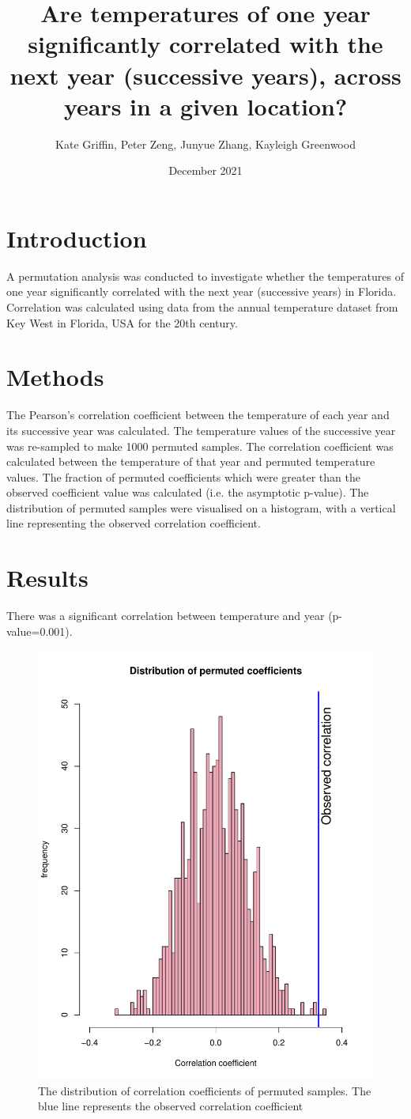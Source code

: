 \documentclass{article}
\title{Are temperatures of one year significantly correlated with the next year (successive years), across years in a given location?}
\author{Kate Griffin, Peter Zeng, Junyue Zhang, Kayleigh Greenwood}
\date{December 2021}
\begin{document}
	
	\maketitle
	
	\section{Introduction}
	A permutation analysis was conducted to investigate whether the temperatures of one year significantly correlated with the next year (successive years) in Florida. Correlation was calculated using data from the annual temperature dataset from Key West in Florida, USA for the 20th century. 
	
	\section{Methods}
	The Pearson's correlation coefficient between the temperature of each year and its successive year was calculated. The temperature values of the successive year was re-sampled to make 1000 permuted samples. The correlation coefficient was calculated between the temperature of that year and permuted temperature values. The fraction of permuted coefficients which were greater than the observed coefficient value was calculated (i.e. the asymptotic p-value). The distribution of permuted samples were visualised on a histogram, with a vertical line representing the observed correlation coefficient. 
	
	\section{Results} 
	There was a significant correlation between temperature and year (p-value=0.001). 
	\begin{figure}[H]
		\includegraphics[width= 50 mm, scale=0.31]{../results/TAutoCorr_hist.pdf}
		\caption{The distribution of correlation coefficients of permuted samples. The blue line represents the observed correlation coefficient}
		\label{The distribution of correlation coefficients of permuted samples. The blue line represents the observed correlation coefficient}
	\end{figure}
	
\end{document}
